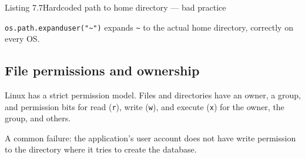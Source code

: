 \begin{codeboxcap}[short]{\textcolor{accent}{Listing 7.7}\enspace Hardcoded path to home directory --- bad practice}

\begin{Shaded}
\begin{Highlighting}[]

\OperatorTok{=} 


\OperatorTok{=}\NormalTok{), }\NormalTok{, }\NormalTok{)}
\OperatorTok{=}\OperatorTok{/}  \OperatorTok{/} 
\end{Highlighting}
\end{Shaded}

\end{codeboxcap}

\noindent{}\texttt{os.path.expanduser("\textasciitilde{}")} expands \texttt{\textasciitilde{}} to the actual home directory, correctly on every OS.

\subsection*{File permissions and ownership}\label{07-environment-drift:file-permissions-and-ownership}

Linux has a strict permission model. Files and directories have an owner, a group, and permission bits for read (\texttt{r}), write (\texttt{w}), and execute (\texttt{x}) for the owner, the group, and others.

A common failure: the application's user account does not have write permission to the directory where it tries to create the database.


